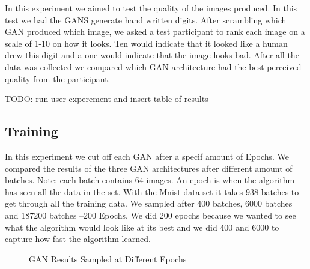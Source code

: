 \documentclass[12pt,
 reprint,
 amsmath,amssymb,
 aps,
]{revtex4-2}
\begin{document}
In this experiment we aimed to test the quality of the images produced. In this test we had the GANS generate hand written digits. After scrambling which GAN produced which image, we asked a test participant to rank each image on a scale of 1-10 on how it looks. Ten would indicate that it looked like a human drew this digit and a one would indicate that the image looks bad. After all the data was collected we compared which GAN architecture had the best perceived quality from the participant. 

TODO: run user experement and insert table of results


\subsection{\label{sec:expTime}Training}

In this experiment we cut off each GAN after a specif amount of Epochs. We compared the results of the three GAN architectures after different amount of batches. Note: each batch contains 64 images. An epoch is when the algorithm has seen all the data in the set. With the Mnist data set it takes 938 batches to get through all the training data. We sampled after 400 batches, 6000 batches and 
187200 batches --200 Epochs. We did 200 epochs because we wanted to see what the algorithm would look like at its best and we did 400 and 6000 to capture how fast the algorithm learned.

\begin{figure}[h!]
    \centering
    \qquad
    \qquad
    \caption{GAN Results Sampled at Different Epochs}%
    \label{fig:ganResults}%
\end{figure}
\end{document}
